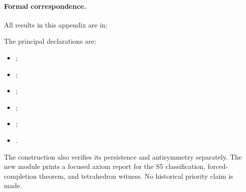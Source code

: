 \paragraph{Formal correspondence.}
All results in this appendix are in:
\par{}\par
The principal declarations are:
\begin{itemize}
\item {};
\item {};
\item {};
\item {};
\item {};
\item {}.
\end{itemize}
The construction also verifies its persistence and antisymmetry separately.
The new module prints a focused axiom report for the S5 classification,
forced-completion theorem, and tetrahedron witness. No historical priority
claim is made.
